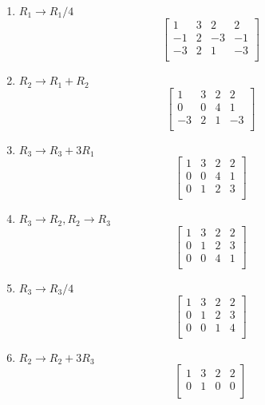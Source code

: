 \documentclass{article}
\begin{document}
\begin{enumerate}
    \item $R_1 \to R_1 / 4$
          \[
              \begin{bmatrix}
                  1  & 3 & 2  & 2  \\
                  -1 & 2 & -3 & -1 \\
                  -3 & 2 & 1  & -3 \\
              \end{bmatrix}
          \]
    \item $R_2 \to R_1 + R_2$
          \[
              \begin{bmatrix}
                  1  & 3 & 2 & 2  \\
                  0  & 0 & 4 & 1  \\
                  -3 & 2 & 1 & -3 \\
              \end{bmatrix}
          \]
    \item $R_3 \to R_3 + 3R_1$
          \[
              \begin{bmatrix}
                  1 & 3 & 2 & 2 \\
                  0 & 0 & 4 & 1 \\
                  0 & 1 & 2 & 3 \\
              \end{bmatrix}
          \]
    \item $R_3 \to R_2, R_2 \to R_3$
          \[
              \begin{bmatrix}
                  1 & 3 & 2 & 2 \\
                  0 & 1 & 2 & 3 \\
                  0 & 0 & 4 & 1 \\
              \end{bmatrix}
          \]
    \item $R_3 \to R_3/4$
          \[
              \begin{bmatrix}
                  1 & 3 & 2 & 2 \\
                  0 & 1 & 2 & 3 \\
                  0 & 0 & 1 & 4 \\
              \end{bmatrix}
          \]
    \item $R_2 \to R_2 + 3R_3$
          \[
              \begin{bmatrix}
                  1 & 3 & 2 & 2 \\
                  0 & 1 & 0 & 0 \\

\end{bmatrix}\]
\end{enumerate}
\end{document}
